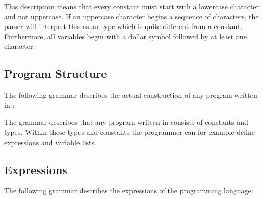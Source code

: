This description means that every constant must start with a lowercase character and not uppercase. If an uppercase character begins a sequence of characters, the parser will interpret this as an type which is quite different from a constant. Furthermore, all variables begin with a dollar symbol followed by at least one character.

\subsection{Program Structure}
The following grammar describes the actual construction of any program written in \productname{}:

\begin{ebnf}
\end{ebnf}

The grammar describes that any program written in \productname{} consists of constants and types. Within these types and constants the programmer can for example define expressions and variable lists.

\subsection{Expressions}
The following grammar describes the expressions of the programming language:

